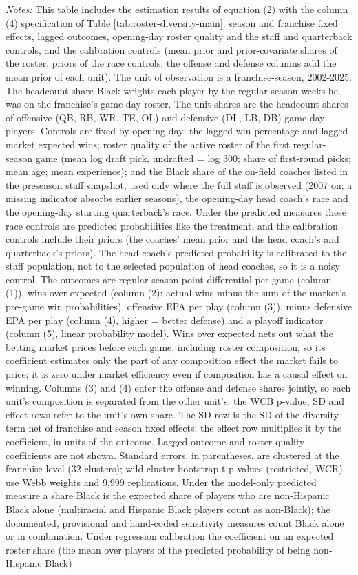 {\footnotesize
\noindent\textit{Notes:} This table includes the estimation results of equation (2) with the column (4) specification of Table \ref{tab:roster-diversity-main}: season and franchise fixed effects, lagged outcomes, opening-day roster quality and the staff and quarterback controls, and the calibration controls (mean prior and prior-covariate shares of the roster, priors of the race controls; the offense and defense columns add the mean prior of each unit). The unit of observation is a franchise-season, 2002-2025. The headcount share Black weights each player by the regular-season weeks he was on the franchise's game-day roster. The unit shares are the headcount shares of offensive (QB, RB, WR, TE, OL) and defensive (DL, LB, DB) game-day players. Controls are fixed by opening day: the lagged win percentage and lagged market expected wins; roster quality of the active roster of the first regular-season game (mean log draft pick, undrafted = log 300; share of first-round picks; mean age; mean experience); and the Black share of the on-field coaches listed in the preseason staff snapshot, used only where the full staff is observed (2007 on; a missing indicator absorbs earlier seasons), the opening-day head coach's race and the opening-day starting quarterback's race. Under the predicted measures these race controls are predicted probabilities like the treatment, and the calibration controls include their priors (the coaches' mean prior and the head coach's and quarterback's priors). The head coach's predicted probability is calibrated to the staff population, not to the selected population of head coaches, so it is a noisy control. The outcomes are regular-season point differential per game (column (1)), wins over expected (column (2): actual wins minus the sum of the market's pre-game win probabilities), offensive EPA per play (column (3)), minus defensive EPA per play (column (4), higher = better defense) and a playoff indicator (column (5), linear probability model). Wins over expected nets out what the betting market prices before each game, including roster composition, so its coefficient estimates only the part of any composition effect the market fails to price; it is zero under market efficiency even if composition has a causal effect on winning. Columns (3) and (4) enter the offense and defense shares jointly, so each unit's composition is separated from the other unit's; the WCB p-value, SD and effect rows refer to the unit's own share. The SD row is the SD of the diversity term net of franchise and season fixed effects; the effect row multiplies it by the coefficient, in units of the outcome. Lagged-outcome and roster-quality coefficients are not shown. Standard errors, in parentheses, are clustered at the franchise level (32 clusters); wild cluster bootstrap-t p-values (restricted, WCR) use Webb weights and 9,999 replications. Under the model-only predicted measure a share Black is the expected share of players who are non-Hispanic Black alone (multiracial and Hispanic Black players count as non-Black); the documented, provisional and hand-coded sensitivity measures count Black alone or in combination. Under regression calibration the coefficient on an expected roster share (the mean over players of the predicted probability of being non-Hispanic Black) }
